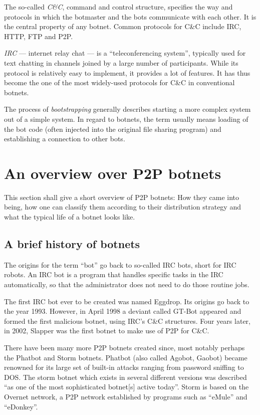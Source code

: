 \documentclass{llncs}
\begin{document}
The so-called {\it C\&C}, command and control structure, specifies
the way and protocols in which the botmaster and the bots communicate
with each other. It is the central property of any botnet. Common
protocols for C\&C include IRC, HTTP, FTP and
P2P.\cite{borgaonkar2010analysis}

{\it IRC} --- internet relay chat --- is a ``teleconferencing
system''\cite{irc}, typically used for text chatting in channels
joined by a large number of participants. While its protocol is
relatively easy to implement, it provides a lot of features. It has
thus become the one of the most widely-used protocols for C\&C in
conventional botnets.

The process of {\it bootstrapping} generally describes starting a more
complex system out of a simple system. In regard to botnets, the
term usually means loading of the bot code (often injected into the
original file sharing program) and establishing a connection to other
bots.\cite{wang2009systematic}


\section{An overview over P2P botnets}
This section shall give a short overview of P2P botnets: How they came
into being, how one can classify them according to their distribution
strategy and what the typical life of a botnet looks like.

\subsection{A brief history of botnets}
The origins for the term ``bot'' go back to so-called IRC bots, short
for IRC robots. An IRC bot is a program that handles specific tasks in
the IRC automatically, so that the administrator does not need to do
those routine jobs.

The first IRC bot ever to be created was named Eggdrop. Its origins go
back to the year 1993. However, in April 1998 a deviant called
GT-Bot appeared and formed the first malicious botnet, using IRC's
C\&C structures. Four years later, in 2002, Slapper was the first
botnet to make use of P2P for C\&C.\cite{li2009botnet}

There have been many more P2P botnets created since, most notably
perhaps the Phatbot and Storm botnets. Phatbot (also called Agobot,
Gaobot) became renowned for its large set of built-in attacks ranging
from password sniffing to DOS.\cite{cooke2005zombie} The storm botnet
which exists in several different versions was described ``as one of
the most sophisticated botnet[s] active
today''\cite{davis2008sybil}. Storm is based on the Overnet network, a
P2P network established by programs such as ``eMule'' and ``eDonkey''.
\end{document}
